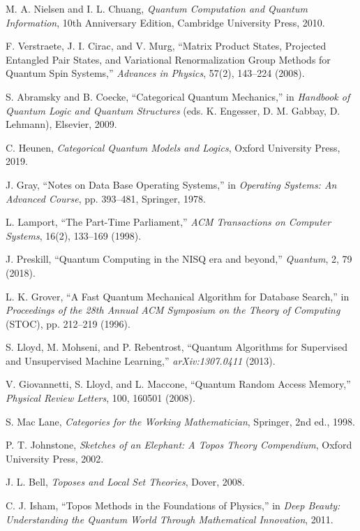\documentclass[11pt]{article}
\begin{document}
\begin{thebibliography}{99}
 M. A. Nielsen and I. L. Chuang, \emph{Quantum Computation and Quantum Information}, 10th Anniversary Edition, Cambridge University Press, 2010.

 F. Verstraete, J. I. Cirac, and V. Murg, ``Matrix Product States, Projected Entangled Pair States, and Variational Renormalization Group Methods for Quantum Spin Systems,'' \emph{Advances in Physics}, 57(2), 143–224 (2008).

 S. Abramsky and B. Coecke, ``Categorical Quantum Mechanics,'' in \emph{Handbook of Quantum Logic and Quantum Structures} (eds. K. Engesser, D. M. Gabbay, D. Lehmann), Elsevier, 2009.

 C. Heunen, \emph{Categorical Quantum Models and Logics}, Oxford University Press, 2019.

 J. Gray, ``Notes on Data Base Operating Systems,'' in \emph{Operating Systems: An Advanced Course}, pp. 393–481, Springer, 1978.

 L. Lamport, ``The Part-Time Parliament,'' \emph{ACM Transactions on Computer Systems}, 16(2), 133–169 (1998).

 J. Preskill, ``Quantum Computing in the NISQ era and beyond,'' \emph{Quantum}, 2, 79 (2018).

 L. K. Grover, ``A Fast Quantum Mechanical Algorithm for Database Search,'' in \emph{Proceedings of the 28th Annual ACM Symposium on the Theory of Computing} (STOC), pp. 212–219 (1996).

 S. Lloyd, M. Mohseni, and P. Rebentrost, ``Quantum Algorithms for Supervised and Unsupervised Machine Learning,'' \emph{arXiv:1307.0411} (2013).

 V. Giovannetti, S. Lloyd, and L. Maccone, ``Quantum Random Access Memory,'' \emph{Physical Review Letters}, 100, 160501 (2008).

 S. Mac Lane, \emph{Categories for the Working Mathematician}, Springer, 2nd ed., 1998.

 P. T. Johnstone, \emph{Sketches of an Elephant: A Topos Theory Compendium}, Oxford University Press, 2002.

 J. L. Bell, \emph{Toposes and Local Set Theories}, Dover, 2008.

 C. J. Isham, ``Topos Methods in the Foundations of Physics,'' in \emph{Deep Beauty: Understanding the Quantum World Through Mathematical Innovation}, 2011.


\end{thebibliography}
\end{document}
